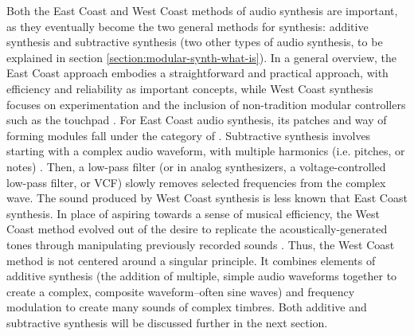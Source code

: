 Both the East Coast and West Coast methods of audio synthesis are important, as they eventually become the two general methods for synthesis: additive synthesis and subtractive synthesis (two other types of audio synthesis, to be explained in section \ref{section:modular-synth-what-is}). In a general overview, the East Coast approach embodies a straightforward and practical approach, with efficiency and reliability as important concepts, while West Coast synthesis focuses on experimentation and the inclusion of non-tradition modular controllers such as the touchpad \cite{Meyer_2016}. For East Coast audio synthesis, its patches and way of forming modules fall under the category of . Subtractive synthesis involves starting with a complex audio waveform, with multiple harmonics (i.e. pitches, or notes) \cite{Winer_2018}. Then, a low-pass filter (or in analog synthesizers, a voltage-controlled low-pass filter, or VCF) slowly removes selected frequencies from the complex wave. The sound produced by West Coast synthesis is less known that East Coast synthesis. In place of aspiring towards a sense of musical efficiency, the West Coast method evolved out of the desire to replicate the acoustically-generated tones through manipulating previously recorded sounds \cite{Nielsen}. Thus, the West Coast method is not centered around a singular principle. It combines elements of additive synthesis (the addition of multiple, simple audio waveforms together to create a complex, composite waveform--often sine waves) \cite{Nielsen} and frequency modulation to create many sounds of complex timbres. Both additive and subtractive synthesis will be discussed further in the next section.
